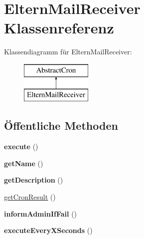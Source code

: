 \hypertarget{class_eltern_mail_receiver}{}\section{Eltern\+Mail\+Receiver Klassenreferenz}
\label{class_eltern_mail_receiver}
Klassendiagramm für Eltern\+Mail\+Receiver\+:\begin{figure}[H]
\begin{center}
\leavevmode
\includegraphics[height=2.000000cm]{class_eltern_mail_receiver}
\end{center}
\end{figure}
\subsection*{Öffentliche Methoden}
\begin{DoxyCompactItemize}
\item 
\mbox{\label{class_eltern_mail_receiver_ab343cc6188d20803e072365ab00b5995}} 
{\bfseries execute} ()
\item 
\mbox{\label{class_eltern_mail_receiver_a22201184f48924604eb245da87f4e7a1}} 
{\bfseries get\+Name} ()
\item 
\mbox{\label{class_eltern_mail_receiver_af43c9fa31029603042eede87711e58f3}} 
{\bfseries get\+Description} ()
\item 
\mbox{\hyperlink{class_eltern_mail_receiver_a562fa2d7b3adb3908c494e817f972a79}{get\+Cron\+Result}} ()
\item 
\mbox{\label{class_eltern_mail_receiver_a41f8bc83694c18281a0bb090b114e9c3}} 
{\bfseries inform\+Admin\+If\+Fail} ()
\item 
\mbox{\label{class_eltern_mail_receiver_a284779efc3f3f29671909dbaabd668f7}} 
{\bfseries execute\+Every\+X\+Seconds} ()
\end{DoxyCompactItemize}


